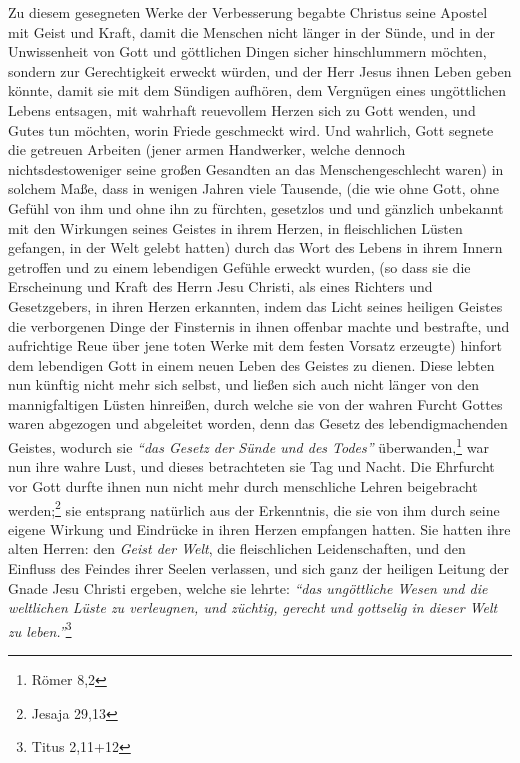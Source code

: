 Zu diesem gesegneten Werke der Verbesserung begabte Christus seine Apostel mit
Geist und Kraft, damit die Menschen nicht länger in der Sünde, und in der
Unwissenheit von Gott und göttlichen Dingen sicher hinschlummern möchten,
sondern zur Gerechtigkeit erweckt würden, und der Herr Jesus ihnen Leben geben
könnte, damit sie mit dem Sündigen aufhören, dem Vergnügen eines ungöttlichen
Lebens
entsagen, mit wahrhaft reuevollem Herzen sich zu Gott wenden, und Gutes tun
möchten, worin Friede geschmeckt wird. Und wahrlich, Gott segnete die getreuen
Arbeiten (jener armen Handwerker, welche dennoch nichtsdestoweniger seine
großen Gesandten an das Menschengeschlecht waren) in solchem Maße, dass in
wenigen Jahren viele Tausende, (die wie ohne Gott, ohne Gefühl von ihm und ohne
ihn
zu fürchten, gesetzlos und und gänzlich unbekannt mit den Wirkungen seines
Geistes in ihrem Herzen, in fleischlichen Lüsten gefangen, in der Welt gelebt
hatten) durch das Wort des Lebens in ihrem Innern getroffen und zu einem
lebendigen Gefühle erweckt wurden, (so dass sie die Erscheinung und Kraft des
Herrn Jesu Christi, als eines Richters und Gesetzgebers, in ihren Herzen
erkannten, indem das Licht seines heiligen Geistes die verborgenen Dinge der
Finsternis in ihnen offenbar machte und bestrafte, und aufrichtige Reue über
jene toten Werke mit dem festen Vorsatz erzeugte) hinfort dem lebendigen Gott
in einem neuen Leben des Geistes zu dienen. Diese lebten nun künftig nicht mehr
sich selbst, und ließen sich auch nicht länger von den mannigfaltigen Lüsten
hinreißen, durch welche sie von der wahren Furcht Gottes waren abgezogen und
abgeleitet worden, denn das Gesetz des lebendigmachenden Geistes, wodurch sie
\textit{"`das Gesetz der Sünde und des Todes"'} überwanden,\footnote{Römer 8,2}
 war nun
ihre wahre Lust, und dieses betrachteten sie Tag und Nacht. Die Ehrfurcht vor
Gott durfte ihnen nun nicht mehr durch menschliche Lehren beigebracht
werden;\footnote{Jesaja 29,13} sie entsprang
natürlich aus der Erkenntnis, die sie von
ihm durch seine eigene Wirkung und Eindrücke in ihren Herzen empfangen
hatten. Sie hatten ihre alten Herren: den \textit{Geist der Welt}, die
fleischlichen
Leidenschaften, und den Einfluss des Feindes ihrer Seelen verlassen, und sich
ganz der heiligen Leitung der Gnade Jesu Christi ergeben, welche sie lehrte:
\textit{"`das ungöttliche Wesen und die weltlichen Lüste zu verleugnen, und
züchtig, gerecht und gottselig in dieser Welt zu leben."'}\footnote{Titus
2,11+12}

